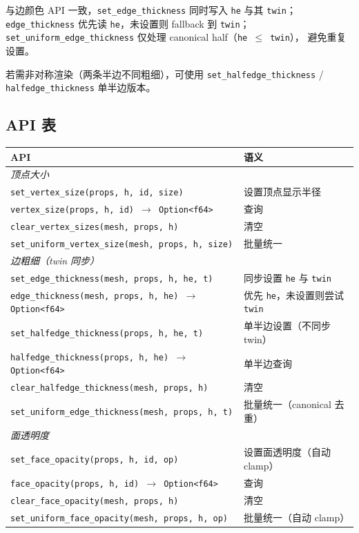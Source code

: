 \documentclass[11pt,a4paper]{article}
\begin{document}
与边颜色 API 一致，\texttt{set\_edge\_thickness} 同时写入 \texttt{he} 与其 \texttt{twin}；
\texttt{edge\_thickness} 优先读 \texttt{he}，未设置则 fallback 到 \texttt{twin}；
\texttt{set\_uniform\_edge\_thickness} 仅处理 canonical half（\texttt{he $\le$ twin}），
避免重复设置。

\begin{sloppypar}
若需非对称渲染（两条半边不同粗细），可使用 \texttt{set\_halfedge\_thickness} /
\texttt{halfedge\_thickness} 单半边版本。
\end{sloppypar}

\subsection{API 表}

\begin{longtable}{@{}ll@{}}
  \toprule
  \textbf{API} & \textbf{语义} \\
  \midrule
  \endhead
  \multicolumn{2}{l}{\textit{顶点大小}} \\
  \texttt{set\_vertex\_size(props, h, id, size)}                & 设置顶点显示半径 \\
  \texttt{vertex\_size(props, h, id) $\to$ Option<f64>}        & 查询 \\
  \texttt{clear\_vertex\_sizes(mesh, props, h)}                & 清空 \\
  \texttt{set\_uniform\_vertex\_size(mesh, props, h, size)}    & 批量统一 \\
  \midrule
  \multicolumn{2}{l}{\textit{边粗细（twin 同步）}} \\
  \texttt{set\_edge\_thickness(mesh, props, h, he, t)}          & 同步设置 \texttt{he} 与 \texttt{twin} \\
  \texttt{edge\_thickness(mesh, props, h, he) $\to$ Option<f64>} & 优先 \texttt{he}，未设置则尝试 \texttt{twin} \\
  \texttt{set\_halfedge\_thickness(props, h, he, t)}             & 单半边设置（不同步 twin） \\
  \texttt{halfedge\_thickness(props, h, he) $\to$ Option<f64>}  & 单半边查询 \\
  \texttt{clear\_halfedge\_thickness(mesh, props, h)}           & 清空 \\
  \texttt{set\_uniform\_edge\_thickness(mesh, props, h, t)}    & 批量统一（canonical 去重） \\
  \midrule
  \multicolumn{2}{l}{\textit{面透明度}} \\
  \texttt{set\_face\_opacity(props, h, id, op)}                & 设置面透明度（自动 clamp） \\
  \texttt{face\_opacity(props, h, id) $\to$ Option<f64>}       & 查询 \\
  \texttt{clear\_face\_opacity(mesh, props, h)}                & 清空 \\
  \texttt{set\_uniform\_face\_opacity(mesh, props, h, op)}     & 批量统一（自动 clamp） \\
  \bottomrule
\end{longtable}
\end{document}
